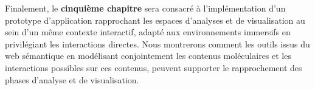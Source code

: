 Finalement, le \textbf{cinquième chapitre} sera consacré à l'implémentation d'un prototype d'application rapprochant les espaces d'analyses et de visualisation au sein d'un même contexte interactif, adapté aux environnements immersifs en privilégiant les interactions directes. Nous montrerons comment les outils issus du web sémantique en modélisant conjointement les contenus moléculaires et les interactions possibles sur ces contenus, peuvent supporter le rapprochement des phases d'analyse et de visualisation. 